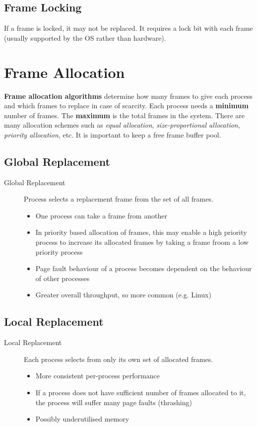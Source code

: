 \documentclass[11pt]{article}
\begin{document}
\subsection{Frame Locking}
\label{sec:org1a9f31b}
If a frame is locked, it may not be replaced.
It requires a lock bit with each frame (usually supported by the OS rather than hardware).

\section{Frame Allocation}
\label{sec:orgb60ec21}
\textbf{Frame allocation algorithms} determine how many frames to give each process and which frames to replace in case of scarcity.
Each process needs a \textbf{minimum} number of frames.
The \textbf{maximum} is the total frames in the system.
There are many allocation schemes such as \emph{equal allocation}, \emph{size-proportional allocation}, \emph{priority allocation}, etc.
It is important to keep a free frame buffer pool.

\subsection{Global Replacement}
\label{sec:orgfa26708}
\begin{description}
\item[{Global Replacement}] Process selects a replacement frame from the set of all frames.
\begin{itemize}
\item One process can take a frame from another
\item In priority based allocation of frames, this may enable a high priority process to increase its allocated frames by taking a frame froom a low priority process
\item Page fault behaviour of a process becomes dependent on the behaviour of other processes
\item Greater overall throughput, so more common (e.g. Linux)
\end{itemize}
\end{description}
\subsection{Local Replacement}
\label{sec:org71f869e}
\begin{description}
\item[{Local Replacement}] Each process selects from only its own set of allocated frames.
\begin{itemize}
\item More consistent per-process performance
\item If a process does not have sufficient number of frames allocated to it, the process will suffer many page faults (thrashing)
\item Possibly underutilised memory
\end{itemize}
\end{description}
\end{document}
